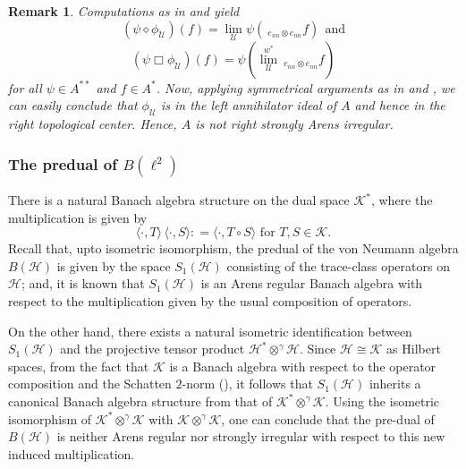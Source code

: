 \documentclass[a4]{amsart}
\theoremstyle{cupthm}
\theoremstyle{cupdefn}
\theoremstyle{cuprem}
\newtheorem{rem}[thm]{Remark}
\numberwithin{equation}{section}
\newcommand{\obp}{\otimes^{\gamma}}
\newcommand{\mH}{\mathcal{H}}
\newcommand{\mK}{\mathcal{K}}
\def\la{\langle}
\def\ra{\rangle}
\begin{document}
\begin{rem}
Computations as in  and  yield
\[
(\psi\diamond\phi_{\mathcal U})(f)= \lim_{\mathcal U}\psi\left(~_{
  e_{nn}\otimes e_{nn}}f\right) ~~\text {and} \]
$$(\psi\Box\phi_{\mathcal
  U})(f)=\psi\left(\overset{w^*}{\lim_{\mathcal U}}~_{e_{nn}\otimes
  e_{nn}}f\right)
 $$ for all $\psi \in A^{**}$ and $f \in A^*$. Now, applying
symmetrical arguments as in  and , we
can easily conclude that $\phi_{\mathcal U}$ is in the left
annihilator ideal of $A$ and hence in the right topological
center. Hence, $A$ is not right strongly Arens irregular.
\end{rem}

\subsubsection{The predual of $B(\ell^2)$} 
There is a natural Banach algebra
structure on the dual space $\mathcal K^*$, where the multiplication
is given by
\[
\la \cdot , T \ra \, \la \cdot , S \ra: = \la\cdot , T \circ S
\ra\text { for } T, S \in \mK.
\]
Recall that, upto isometric isomorphism, the
predual of the von Neumann algebra $B(\mH)$ is given by the space
$S_1(\mH)$ consisting of the trace-class operators on $\mH$; and, it
is known that $S_1(\mH)$ is an Arens regular Banach algebra with
respect to the multiplication given by the usual composition of
operators.

 On the other hand, there exists a natural isometric identification
 between $S_1(\mH)$ and the projective tensor product $\mH^* \obp
 \mH$. Since $\mH \cong \mK$ as Hilbert spaces, from the fact that
 $\mK$ is a Banach algebra with respect to the operator composition
 and the Schatten $2$-norm (), it follows that
 $S_1(\mH)$ inherits a canonical Banach algebra structure from that of
 $\mK^* \obp \mK$. Using the isometric isomorphism of $\mathcal
 K^*\obp\mathcal K$ with $\mK\obp\mK$, one can conclude that the
 pre-dual of $B(\mathcal H)$ is neither Arens regular nor strongly
 irregular with respect to this new induced multiplication.
\end{document}
